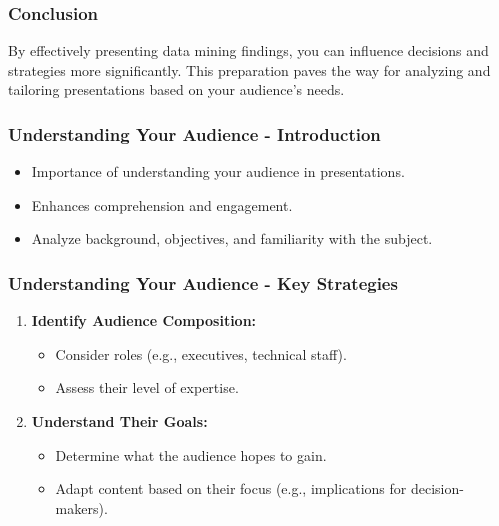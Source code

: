 \documentclass{beamer}
\begin{document}
\begin{frame}[fragile]
    \frametitle{Conclusion}
    By effectively presenting data mining findings, you can influence decisions and strategies more significantly. This preparation paves the way for analyzing and tailoring presentations based on your audience's needs.
\end{frame}

\begin{frame}[fragile]
    \frametitle{Understanding Your Audience - Introduction}
    \begin{itemize}
        \item Importance of understanding your audience in presentations.
        \item Enhances comprehension and engagement.
        \item Analyze background, objectives, and familiarity with the subject.
    \end{itemize}
\end{frame}

\begin{frame}[fragile]
    \frametitle{Understanding Your Audience - Key Strategies}
    \begin{enumerate}
        \item \textbf{Identify Audience Composition:}
        \begin{itemize}
            \item Consider roles (e.g., executives, technical staff).
            \item Assess their level of expertise.
        \end{itemize}

        \item \textbf{Understand Their Goals:}
        \begin{itemize}
            \item Determine what the audience hopes to gain.
            \item Adapt content based on their focus (e.g., implications for decision-makers).
        \end{itemize}
    \end{enumerate}
\end{frame}
\end{document}
